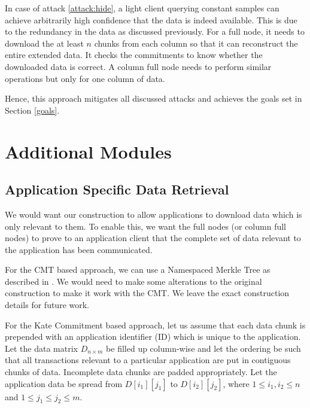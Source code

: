 \documentclass[sigconf, screen=true, nonacm]{acmart}
\newcommand{\DA}{\textit{DA layer}}
\begin{document}
        In case of attack \ref{attack:hide}, a light client querying constant samples can achieve arbitrarily high confidence that the data is indeed available. This is due to the redundancy in the data as discussed previously. For a full node, it needs to download the at least $n$ chunks from each column so that it can reconstruct the entire extended data. It checks the commitments to know whether the downloaded data is correct. A column full node needs to perform similar operations but only for one column of data.
        
        Hence, this approach mitigates all discussed attacks and achieves the goals set in Section \ref{goals}.
        
\section{Additional Modules}
    \subsection{Application Specific Data Retrieval}
        We would want our construction to allow applications to download data which is only relevant to them. To enable this, we want the full nodes (or column full nodes) to prove to an application client that the complete set of data relevant to the application has been communicated.

        
        For the CMT based approach, we can use a Namespaced Merkle Tree as described in \cite{lazyledger}. We would need to make some alterations to the original construction to make it work with the CMT. We leave the exact construction details for future work. 

        For the Kate Commitment based approach, let us assume that each data chunk is prepended with an application identifier (ID) which is unique to the application. 
        Let the data matrix $D_{n \times m}$ be filled up column-wise and let the ordering be such that all transactions relevant to a particular application are put in contiguous chunks of data. Incomplete data chunks are padded appropriately. Let the application data be spread from $D[i_1][j_1]$ to $D[i_2][j_2]$, where $1 \leq i_1, i_2 \leq n$ and $1 \leq j_1 \leq j_2 \leq m$.   
\end{document}
